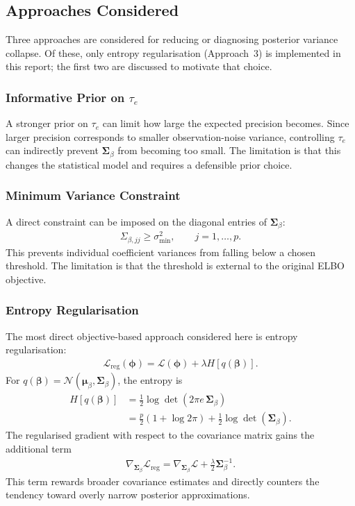 \documentclass[11pt,a4paper]{article}
\newcommand{\N}{\mathcal{N}}
\begin{document}
\subsection{Approaches Considered}

Three approaches are considered for reducing or diagnosing posterior variance collapse. Of these, only entropy regularisation (Approach~3) is implemented in this report; the first two are discussed to motivate that choice.

\subsubsection{Informative Prior on $\tau_e$}

A stronger prior on $\tau_e$ can limit how large the expected precision becomes. Since larger precision corresponds to smaller observation-noise variance, controlling $\tau_e$ can indirectly prevent $\bm{\Sigma}_\beta$ from becoming too small. The limitation is that this changes the statistical model and requires a defensible prior choice.

\subsubsection{Minimum Variance Constraint}

A direct constraint can be imposed on the diagonal entries of $\bm{\Sigma}_\beta$:
\begin{align}
\Sigma_{\beta,jj} \geq \sigma^2_{\min}, \qquad j=1,\ldots,p.
\end{align}
This prevents individual coefficient variances from falling below a chosen threshold. The limitation is that the threshold is external to the original ELBO objective.

\subsubsection{Entropy Regularisation}

The most direct objective-based approach considered here is entropy regularisation:
\begin{align}
\mathcal{L}_{\mathrm{reg}}(\bm{\phi})
= \mathcal{L}(\bm{\phi}) + \lambda H[q(\bm{\beta})].
\end{align}
For $q(\bm{\beta})=\N(\bm{\mu}_\beta,\bm{\Sigma}_\beta)$, the entropy is
\begin{align}
H[q(\bm{\beta})]
&= \frac{1}{2}\log\det(2\pi e\,\bm{\Sigma}_\beta)\\
&= \frac{p}{2}(1+\log 2\pi) + \frac{1}{2}\log\det(\bm{\Sigma}_\beta).
\end{align}
The regularised gradient with respect to the covariance matrix gains the additional term
\begin{align}
\nabla_{\bm{\Sigma}_\beta}\mathcal{L}_{\mathrm{reg}}
= \nabla_{\bm{\Sigma}_\beta}\mathcal{L}
+ \frac{\lambda}{2}\bm{\Sigma}_\beta^{-1}.
\end{align}
This term rewards broader covariance estimates and directly counters the tendency toward overly narrow posterior approximations.
\end{document}
